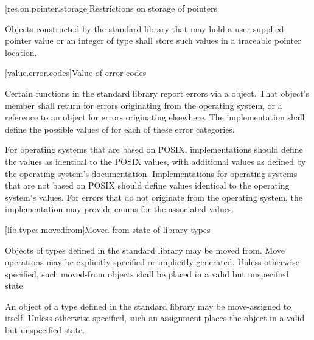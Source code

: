 [res.on.pointer.storage]{Restrictions on storage of pointers}

\pnum
{}%
%
Objects constructed by the standard library that may hold a user-supplied pointer value
or an integer of type  shall store such values in a traceable
pointer location.

[value.error.codes]{Value of error codes}

\pnum
Certain functions in the \Cpp{} standard library report errors via a
 object. That object's
 member shall return  for
errors originating from the operating system, or a reference to an
  object for errors originating elsewhere.
The implementation shall define the possible values of  for each of these
error categories.
\begin{example}
For operating systems that are based on POSIX,
implementations should define the  values as
identical to the POSIX  values, with additional values as defined by the
operating system's documentation. Implementations for operating systems that are not
based on POSIX should define values identical to the operating system's
values. For errors that do not originate from the operating system, the implementation
may provide enums for the associated values.
\end{example}

[lib.types.movedfrom]{Moved-from state of library types}

\pnum
Objects of types defined in the \Cpp{} standard library may be moved
from. Move operations may be explicitly specified or
implicitly generated. Unless otherwise specified, such moved-from objects shall
be placed in a valid but unspecified state.

\pnum
An object of a type defined in the \Cpp{} standard library may be
move-assigned to itself.
Unless otherwise specified, such an assignment places the object in
a valid but unspecified state.
